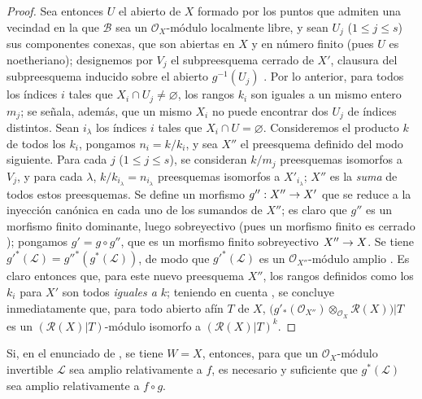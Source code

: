 \documentclass[oneside,10pt]{amsart}
\makeatletter
\renewcommand{\leq}{\leqslant}
\newcommand{\ega@arrow}[2]{\mathchoice{#1}{#2}{#2}{#2}}
\renewcommand{\to}{\ega@arrow{\longrightarrow}{\rightarrow}}
\let\EGAOriginalLabel\label
\renewcommand{\label}[1]{\phantomsection\EGAOriginalLabel{#1}}
\makeatother
\begin{document}
\begin{proof}
Sea entonces $U$ el abierto de $X$ formado por los puntos que admiten una vecindad en la que $\mathcal{B}$ sea un $\mathcal{O}_X$-módulo localmente libre, y sean $U_j$ ($1\leq j\leq s$) sus componentes conexas, que son abiertas en $X$ y en número finito (pues $U$ es noetheriano);
designemos por $V_j$ el subpreesquema cerrado de $X'$, clausura del subpreesquema inducido sobre el abierto $g^{-1}(U_j)$ .
Por lo anterior, para todos los índices $i$ tales que $X_i\cap U_j\neq\varnothing$, los rangos $k_i$ son iguales a un mismo entero $m_j$;
se señala, además, que un mismo $X_i$ no puede encontrar dos $U_j$ de índices distintos.
Sean $i_\lambda$ los índices $i$ tales que $X_i\cap U=\varnothing$.
Consideremos el producto $k$ de todos los $k_i$, pongamos $n_i=k/k_i$, y sea $X''$ el preesquema definido del modo siguiente.
Para cada $j$ ($1\leq j\leq s$), se consideran $k/m_j$ preesquemas isomorfos a $V_j$, y para cada $\lambda$, $k/k_{i_\lambda}=n_{i_\lambda}$ preesquemas isomorfos a $X'_{i_\lambda}$;
$X''$ es la \emph{suma} de todos estos preesquemas.
Se define un morfismo $g'':X''\to X'$ que se reduce a la inyección canónica en cada uno de los sumandos de $X''$;
es claro que $g''$ es un morfismo finito dominante, luego sobreyectivo (pues un morfismo finito es cerrado );
pongamos $g'=g\circ g''$, que es un morfismo finito sobreyectivo $X''\to X$.
Se tiene
${g'}^*(\mathcal{L})={g''}^*(g^*(\mathcal{L}))$,
de modo que ${g'}^*(\mathcal{L})$ es un $\mathcal{O}_{X''}$-módulo amplio .
Es claro entonces que, para este nuevo preesquema $X''$, los rangos definidos como los $k_i$ para $X'$ son todos \emph{iguales a $k$};
teniendo en cuenta , se concluye inmediatamente que, para todo abierto afín $T$ de $X$,
$\bigl(g'_*(\mathcal{O}_{X''})\otimes_{\mathcal{O}_X}\mathcal{R}(X)\bigr)|T$
es un $(\mathcal{R}(X)|T)$-módulo isomorfo a $(\mathcal{R}(X)|T)^k$.
\end{proof}

\begin{corollary}[6.6.12]
\label{II.6.6.12-fr}
Si, en el enunciado de , se tiene $W=X$, entonces, para que un $\mathcal{O}_X$-módulo invertible $\mathcal{L}$ sea amplio relativamente a $f$, es necesario y suficiente que $g^*(\mathcal{L})$ sea amplio relativamente a $f\circ g$.
\end{corollary}
\end{document}
